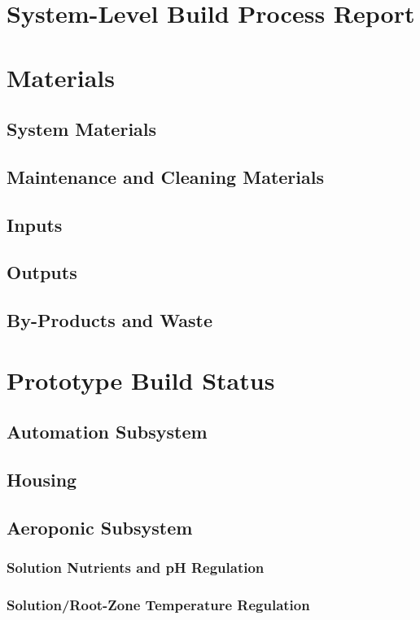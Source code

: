 \documentclass{report}
\begin{document}
\section{System-Level Build Process Report}

\section{Materials}
\subsection{System Materials}
\subsection{Maintenance and Cleaning Materials}
\subsection{Inputs}
\subsection{Outputs}
\subsection{By-Products and Waste}

\section{Prototype Build Status}
\subsection{Automation Subsystem}
\subsection{Housing}
\subsection{Aeroponic Subsystem}
\subsubsection{Solution Nutrients and pH Regulation}
\subsubsection{Solution/Root-Zone Temperature Regulation}
\end{document}
